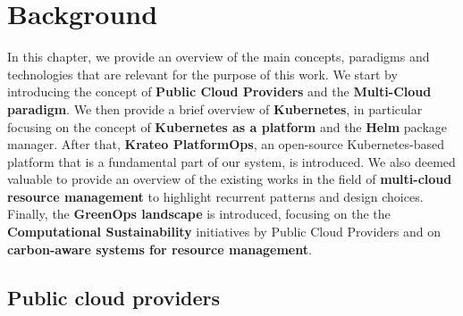 \chapter{Background}
\label{cha:background}

In this chapter, we provide an overview of the main concepts, paradigms and technologies that are relevant for the purpose of this work.
We start by introducing the concept of \textbf{Public Cloud Providers} and the \textbf{Multi-Cloud paradigm}.
We then provide a brief overview of \textbf{Kubernetes}, in particular focusing on the concept of \textbf{Kubernetes as a platform} and the \textbf{Helm} package manager.
After that, \textbf{Krateo PlatformOps}, an open-source Kubernetes-based platform that is a fundamental part of our system, is introduced.
We also deemed valuable to provide an overview of the existing works in the field of \textbf{multi-cloud resource management} to highlight recurrent patterns and design choices.
Finally, the \textbf{GreenOps landscape} is introduced, focusing on the the \textbf{Computational Sustainability} initiatives by Public Cloud Providers and on \textbf{carbon-aware systems for resource management}. 

\section{Public cloud providers}

